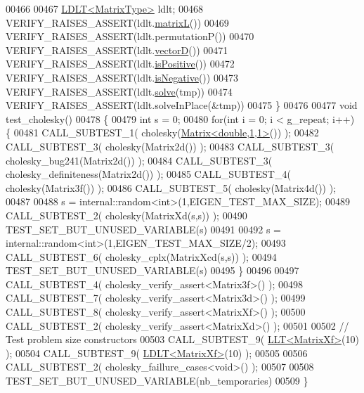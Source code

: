 \begin{DoxyCode}
00466 
00467   \hyperlink{group___cholesky___module_class_eigen_1_1_l_d_l_t}{LDLT<MatrixType>} ldlt;
00468   VERIFY\_RAISES\_ASSERT(ldlt.\hyperlink{group___cholesky___module_af0e6a0df5679873b42cf82a372dd8ddb}{matrixL}())
00469   VERIFY\_RAISES\_ASSERT(ldlt.permutationP())
00470   VERIFY\_RAISES\_ASSERT(ldlt.\hyperlink{group___cholesky___module_af60b2f826a38a00070e0efccf0572066}{vectorD}())
00471   VERIFY\_RAISES\_ASSERT(ldlt.\hyperlink{group___cholesky___module_a5e1c6b7ba8d7b82575d6ffdc3bf35bcb}{isPositive}())
00472   VERIFY\_RAISES\_ASSERT(ldlt.\hyperlink{group___cholesky___module_aabd3e7aebe844034caca4c62dbe9c1eb}{isNegative}())
00473   VERIFY\_RAISES\_ASSERT(ldlt.\hyperlink{group___cholesky___module_aa257dd7a8acf8b347d5a22a13d6ca3e1}{solve}(tmp))
00474   VERIFY\_RAISES\_ASSERT(ldlt.solveInPlace(&tmp))
00475 \}
00476 
00477 \textcolor{keywordtype}{void} test\_cholesky()
00478 \{
00479   \textcolor{keywordtype}{int} s = 0;
00480   \textcolor{keywordflow}{for}(\textcolor{keywordtype}{int} i = 0; i < g\_repeat; i++) \{
00481     CALL\_SUBTEST\_1( cholesky(\hyperlink{group___core___module_class_eigen_1_1_matrix}{Matrix<double,1,1>}()) );
00482     CALL\_SUBTEST\_3( cholesky(Matrix2d()) );
00483     CALL\_SUBTEST\_3( cholesky\_bug241(Matrix2d()) );
00484     CALL\_SUBTEST\_3( cholesky\_definiteness(Matrix2d()) );
00485     CALL\_SUBTEST\_4( cholesky(Matrix3f()) );
00486     CALL\_SUBTEST\_5( cholesky(Matrix4d()) );
00487 
00488     s = internal::random<int>(1,EIGEN\_TEST\_MAX\_SIZE);
00489     CALL\_SUBTEST\_2( cholesky(MatrixXd(s,s)) );
00490     TEST\_SET\_BUT\_UNUSED\_VARIABLE(s)
00491 
00492     s = internal::random<int>(1,EIGEN\_TEST\_MAX\_SIZE/2);
00493     CALL\_SUBTEST\_6( cholesky\_cplx(MatrixXcd(s,s)) );
00494     TEST\_SET\_BUT\_UNUSED\_VARIABLE(s)
00495   \}
00496 
00497   CALL\_SUBTEST\_4( cholesky\_verify\_assert<Matrix3f>() );
00498   CALL\_SUBTEST\_7( cholesky\_verify\_assert<Matrix3d>() );
00499   CALL\_SUBTEST\_8( cholesky\_verify\_assert<MatrixXf>() );
00500   CALL\_SUBTEST\_2( cholesky\_verify\_assert<MatrixXd>() );
00501 
00502   \textcolor{comment}{// Test problem size constructors}
00503   CALL\_SUBTEST\_9( \hyperlink{group___cholesky___module_class_eigen_1_1_l_l_t}{LLT<MatrixXf>}(10) );
00504   CALL\_SUBTEST\_9( \hyperlink{group___cholesky___module_class_eigen_1_1_l_d_l_t}{LDLT<MatrixXf>}(10) );
00505 
00506   CALL\_SUBTEST\_2( cholesky\_faillure\_cases<void>() );
00507 
00508   TEST\_SET\_BUT\_UNUSED\_VARIABLE(nb\_temporaries)
00509 \}
\end{DoxyCode}
